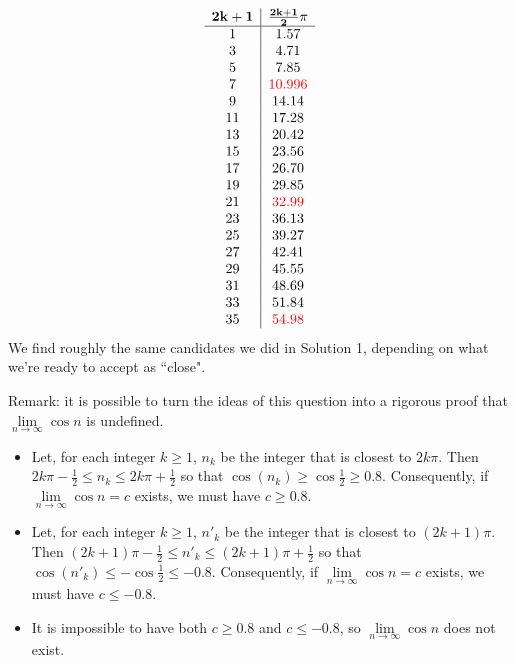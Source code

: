 \begin{solution}
\begin{description}
\[\begin{array}{c|c}
\mathbf{2k+1}&\mathbf{\frac{2k+1}{2}\pi}\\
\hline
1&1.57\\
3&4.71\\
5&7.85\\
7&\color{red}10.996\\
9&14.14\\
11&17.28\\
13&20.42\\
15&23.56\\
17&26.70\\
19&29.85\\
21&\color{red}32.99\\
23&36.13\\
25&39.27\\
27&42.41\\
29&45.55\\
31&48.69\\
33&51.84\\
35&\color{red}54.98
\end{array}
\]
We find roughly the same candidates we did in Solution 1, depending on what we're ready to accept as ``close".
\end{description}
Remark: it is possible to turn the ideas of this question into a rigorous proof 
that $\lim\limits_{n \to \infty}\cos n$ is undefined.
\begin{itemize}
\item 
Let, for each integer $k\ge 1$, $n_k$ be the integer that is closest to
$2k\pi$. Then $2k\pi-\frac{1}{2}\le n_k \le 2k\pi+\frac{1}{2}$ so that
$\cos(n_k)\ge\cos\frac{1}{2}\ge 0.8$. Consequently, if  
$\lim\limits_{n \to \infty}\cos n=c$ exists, we must have $c\ge 0.8$.

\item 
Let, for each integer $k\ge 1$, $n'_k$ be the integer that is closest to
$(2k+1)\pi$. Then $(2k+1)\pi-\frac{1}{2}\le n'_k \le (2k+1)\pi+\frac{1}{2}$ 
so that
$\cos(n'_k)\le-\cos\frac{1}{2}\le -0.8$. Consequently, if  
$\lim\limits_{n \to \infty}\cos n=c$ exists, we must have $c\le -0.8$.

\item
It is impossible to have both $c\ge 0.8$ and $c\le -0.8$, 
so $\lim\limits_{n \to \infty}\cos n$ does not exist.

\end{itemize}
\end{solution}

\subsection*{\Procedural}

